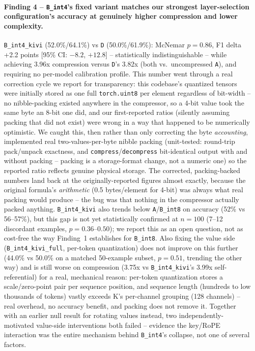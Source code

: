 \documentclass[11pt]{article}
\begin{document}
\paragraph{Finding 4 -- \texttt{B\_int4}'s fixed variant matches our
strongest layer-selection configuration's accuracy at genuinely higher
compression and lower complexity.} \texttt{B\_int4\_kivi}
(52.0\%/64.1\%) vs \texttt{D} (50.0\%/61.9\%): McNemar $p=0.86$, F1 delta
+2.2 points [95\% CI: $-8.2$, $+12.8$] -- statistically indistinguishable
-- while achieving 3.96x compression versus \texttt{D}'s 3.82x (both vs.\
uncompressed \texttt{A}), and requiring no per-model calibration profile.
This number went through a real correction cycle we report for
transparency: this codebase's quantized tensors were initially stored as
one full \texttt{torch.uint8} per element regardless of bit-width -- no
nibble-packing existed anywhere in the compressor, so a 4-bit value took
the same byte an 8-bit one did, and our first-reported ratios (silently
assuming packing that did not exist) were wrong in a way that happened to
be numerically optimistic. We caught this, then rather than only
correcting the byte \emph{accounting}, implemented real
two-values-per-byte nibble packing (unit-tested: round-trip pack/unpack
exactness, and \texttt{compress}/\texttt{decompress} bit-identical output
with and without packing -- packing is a storage-format change, not a
numeric one) so the reported ratio reflects genuine physical storage. The
corrected, packing-backed numbers land back at the originally-reported
figures almost exactly, because the original formula's \emph{arithmetic}
(0.5 bytes/element for 4-bit) was always what real packing would produce
-- the bug was that nothing in the compressor actually packed anything.
\texttt{B\_int4\_kivi} also trends below \texttt{A}/\texttt{B\_int8} on
accuracy (52\% vs 56--57\%), but this gap is not yet statistically
confirmed at $n=100$ (7--12 discordant examples, $p=0.36$--$0.50$); we
report this as an open question, not as cost-free the way Finding~1
establishes for \texttt{B\_int8}. Also fixing the value side
(\texttt{B\_int4\_kivi\_full}, per-token quantization) does not improve
on this further (44.0\% vs 50.0\% on a matched 50-example subset,
$p=0.51$, trending the other way) and is still worse on compression
(3.75x vs \texttt{B\_int4\_kivi}'s 3.99x self-referential) for a real,
mechanical reason: per-token quantization stores a scale/zero-point pair
per sequence position, and sequence length (hundreds to low thousands of
tokens) vastly exceeds K's per-channel grouping (128 channels) -- real
overhead, no accuracy benefit, and packing does not remove it. Together
with an earlier null result for rotating values instead, two
independently-motivated value-side interventions both failed -- evidence
the key/RoPE interaction was the entire mechanism behind
\texttt{B\_int4}'s collapse, not one of several factors.
\end{document}
